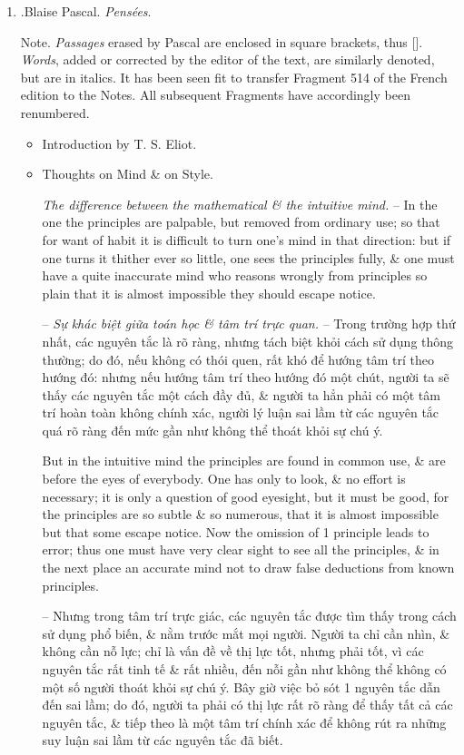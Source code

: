 \documentclass{article}
\begin{document}
\begin{enumerate}
	\item \cite{Pascal_pensees}.{\sc Blaise Pascal}. {\it Pens\'ees}.
	
	{\sf Note.} {\it Passages} erased by {\sc Pascal} are enclosed in square brackets, thus []. {\it Words}, added or corrected by the editor of the text, are similarly denoted, but are in italics. It has been seen fit to transfer Fragment 514 of the French edition to the Notes. All subsequent Fragments have accordingly been renumbered.
	\begin{itemize}
		\item {\sf Introduction by {\sc T. S. Eliot}.}
		\item {\sf Thoughts on Mind \& on Style.}
		
		 {\it The difference between the mathematical \& the intuitive mind.} -- In the one the principles are palpable, but removed from ordinary use; so that for want of habit it is difficult to turn one's mind in that direction: but if one turns it thither ever so little, one sees the principles fully, \& one must have a quite inaccurate mind who reasons wrongly from principles so plain that it is almost impossible they should escape notice.
		
		-- {\it Sự khác biệt giữa toán học \& tâm trí trực quan.} -- Trong trường hợp thứ nhất, các nguyên tắc là rõ ràng, nhưng tách biệt khỏi cách sử dụng thông thường; do đó, nếu không có thói quen, rất khó để hướng tâm trí theo hướng đó: nhưng nếu hướng tâm trí theo hướng đó một chút, người ta sẽ thấy các nguyên tắc một cách đầy đủ, \& người ta hẳn phải có một tâm trí hoàn toàn không chính xác, người lý luận sai lầm từ các nguyên tắc quá rõ ràng đến mức gần như không thể thoát khỏi sự chú ý.
		
		But in the intuitive mind the principles are found in common use, \& are before the eyes of everybody. One has only to look, \& no effort is necessary; it is only a question of good eyesight, but it must be good, for the principles are so subtle \& so numerous, that it is almost impossible but that some escape notice. Now the omission of 1 principle leads to error; thus one must have very clear sight to see all the principles, \& in the next place an accurate mind not to draw false deductions from known principles.
		
		-- Nhưng trong tâm trí trực giác, các nguyên tắc được tìm thấy trong cách sử dụng phổ biến, \& nằm trước mắt mọi người. Người ta chỉ cần nhìn, \& không cần nỗ lực; chỉ là vấn đề về thị lực tốt, nhưng phải tốt, vì các nguyên tắc rất tinh tế \& rất nhiều, đến nỗi gần như không thể không có một số người thoát khỏi sự chú ý. Bây giờ việc bỏ sót 1 nguyên tắc dẫn đến sai lầm; do đó, người ta phải có thị lực rất rõ ràng để thấy tất cả các nguyên tắc, \& tiếp theo là một tâm trí chính xác để không rút ra những suy luận sai lầm từ các nguyên tắc đã biết.
				

\end{itemize}
\end{enumerate}
\end{document}
